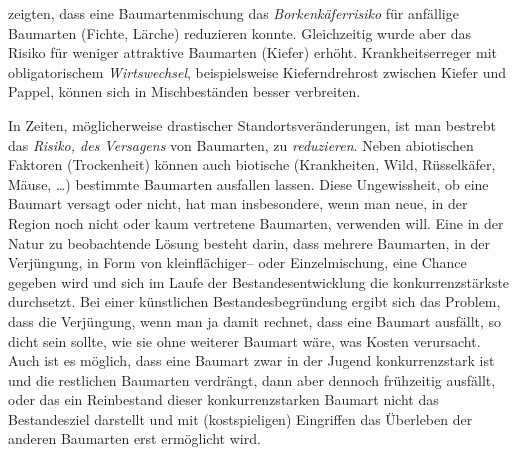 \documentclass[twocolumn]{scrartcl}
\begin{document}
\cite{sylvie2021mischwaldInsekten} zeigten, dass eine
Baumartenmischung das \emph{Borkenkäferrisiko} für anfällige Baumarten
(Fichte, Lärche) reduzieren konnte. Gleichzeitig wurde aber das Risiko
für weniger attraktive Baumarten (Kiefer) erhöht. Krankheitserreger
mit obligatorischem \emph{Wirtswechsel}, beispielsweise
Kieferndrehrost zwischen Kiefer und Pappel, können sich in
Mischbeständen besser verbreiten.

In Zeiten, möglicherweise drastischer Standortsveränderungen, ist man bestrebt
das \emph{Risiko, des Versagens} von Baumarten, zu \emph{reduzieren}. Neben
abiotischen Faktoren (Trockenheit) können auch biotische (Krankheiten, Wild,
Rüsselkäfer, Mäuse, \dots) bestimmte Baumarten ausfallen lassen. Diese
Ungewissheit, ob eine Baumart versagt oder nicht, hat man insbesondere, wenn man
neue, in der Region noch nicht oder kaum vertretene Baumarten, verwenden will.
Eine in der Natur zu beobachtende Lösung besteht darin, dass mehrere Baumarten,
in der Verjüngung, in Form von kleinflächiger-- oder Einzelmischung, eine Chance
gegeben wird und sich im Laufe der Bestandesentwicklung die konkurrenzstärkste
durchsetzt. Bei einer künstlichen Bestandesbegründung ergibt sich das Problem,
dass die Verjüngung, wenn man ja damit rechnet, dass eine Baumart ausfällt, so
dicht sein sollte, wie sie ohne weiterer Baumart wäre, was Kosten verursacht.
Auch ist es möglich, dass eine Baumart zwar in der Jugend konkurrenzstark ist
und die restlichen Baumarten verdrängt, dann aber dennoch frühzeitig ausfällt,
oder das ein Reinbestand dieser konkurrenzstarken Baumart nicht das
Bestandesziel darstellt und mit (kostspieligen) Eingriffen das Überleben der
anderen Baumarten erst ermöglicht wird.
\end{document}
